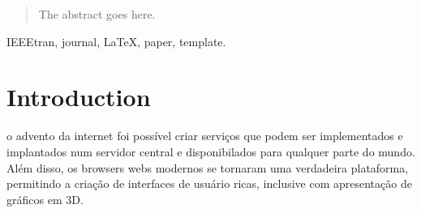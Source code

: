 \documentclass[journal]{IEEEtran}
\begin{document}







\maketitle

\begin{abstract}
The abstract goes here.
\end{abstract}

\begin{IEEEkeywords}
IEEEtran, journal, \LaTeX, paper, template.
\end{IEEEkeywords}






%
\IEEEpeerreviewmaketitle



\section{Introduction}
% 
% 
% 
% 
 o advento da internet foi possível criar serviços 
que podem ser implementados e implantados num servidor central e 
disponibilados para qualquer parte do mundo. 
Além disso, os browsers webs modernos se tornaram uma verdadeira plataforma,
permitindo a criação de interfaces de usuário ricas, inclusive com apresentação 
de gráficos em 3D. 
\end{document}
